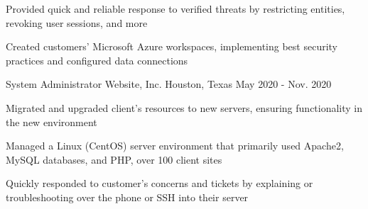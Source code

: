 \begin{cventries}
{\begin{cvitems}
      \item {Provided quick and reliable response to verified threats by restricting entities, revoking user sessions, and more}
      \item{Created customers' Microsoft Azure workspaces, implementing best security practices and configured data connections}
    \end{cvitems}
  }
\cventry
  {System Administrator} %
  {Website, Inc.} %
  {Houston, Texas} %
  {May 2020 - Nov. 2020} %
  {
    \begin{cvitems}
      \item{Migrated and upgraded client's resources to new servers, ensuring functionality in the new environment}
      \item {Managed a Linux (CentOS) server environment that primarily used Apache2, MySQL databases, and PHP, over 100 client sites}
      \item {Quickly responded to customer's concerns and tickets by explaining or troubleshooting over the phone or SSH into their server}
    \end{cvitems}
  }
  \end{cventries}
